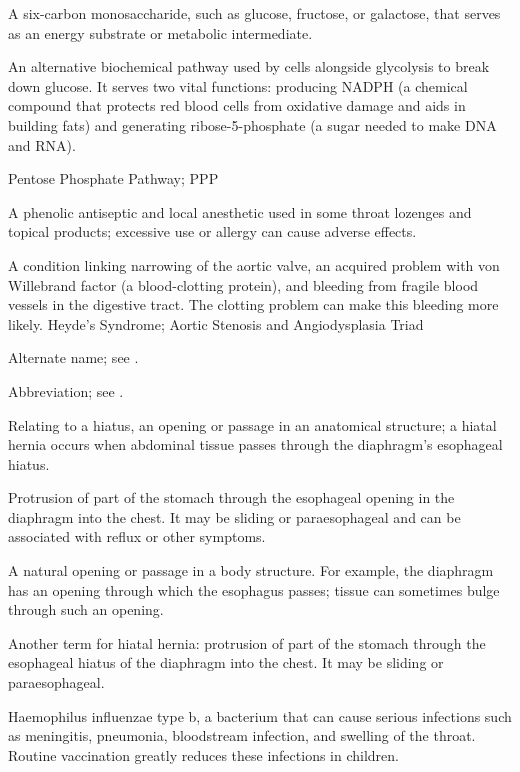  A six-carbon monosaccharide, such as glucose, fructose, or galactose, that serves as an energy substrate or metabolic intermediate.

 An alternative biochemical pathway used by cells alongside glycolysis to break down glucose. It serves two vital functions: producing NADPH (a chemical compound that protects red blood cells from oxidative damage and aids in building fats) and generating ribose-5-phosphate (a sugar needed to make DNA and RNA).

\synonyms
Pentose Phosphate Pathway; PPP

 A phenolic antiseptic and local anesthetic used in some throat lozenges and topical products; excessive use or allergy can cause adverse effects.

 A condition linking narrowing of the aortic valve, an acquired problem with von Willebrand factor (a blood-clotting protein), and bleeding from fragile blood vessels in the digestive tract. The clotting problem can make this bleeding more likely.
\synonyms
Heyde's Syndrome; Aortic Stenosis and Angiodysplasia Triad

 Alternate name; see .

 Abbreviation; see .

 Relating to a hiatus, an opening or passage in an anatomical structure; a hiatal hernia occurs when abdominal tissue passes through the diaphragm's esophageal hiatus.

 Protrusion of part of the stomach through the esophageal opening in the diaphragm into the
chest. It may be sliding or paraesophageal and can be associated with reflux or other symptoms.

 A natural opening or passage in a body structure. For example, the diaphragm has an opening through which the esophagus passes; tissue can sometimes bulge through such an opening.

 Another term for hiatal hernia: protrusion of part of the stomach through the esophageal hiatus
of the diaphragm into the chest. It may be sliding or paraesophageal.

 Haemophilus influenzae type b, a bacterium that can cause serious infections such as meningitis, pneumonia, bloodstream infection, and swelling of the throat. Routine vaccination greatly reduces these infections in children.

